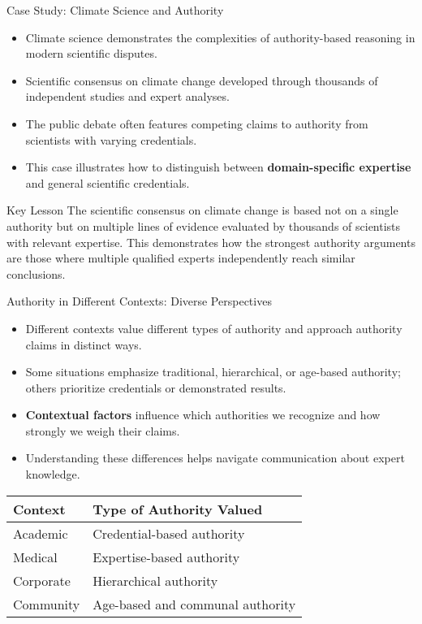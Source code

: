 \documentclass{beamer}
\begin{document}
\begin{frame}{Case Study: Climate Science and Authority}
    \begin{itemize}
        \item Climate science demonstrates the complexities of authority-based reasoning in modern scientific disputes.
        \item Scientific consensus on climate change developed through thousands of independent studies and expert analyses.
        \item The public debate often features competing claims to authority from scientists with varying credentials.
        \item This case illustrates how to distinguish between \textbf{domain-specific expertise} and general scientific credentials.
    \end{itemize}
    
    \begin{alertblock}{Key Lesson}
        The scientific consensus on climate change is based not on a single authority but on multiple lines of evidence evaluated by thousands of scientists with relevant expertise. This demonstrates how the strongest authority arguments are those where multiple qualified experts independently reach similar conclusions.
    \end{alertblock}
\end{frame}

\begin{frame}{Authority in Different Contexts: Diverse Perspectives}
    \begin{itemize}
        \item Different contexts value different types of authority and approach authority claims in distinct ways.
        \item Some situations emphasize traditional, hierarchical, or age-based authority; others prioritize credentials or demonstrated results.
        \item \textbf{Contextual factors} influence which authorities we recognize and how strongly we weigh their claims.
        \item Understanding these differences helps navigate communication about expert knowledge.
    \end{itemize}
    
    \begin{table}
        \centering
        \begin{tabular}{|l|l|}
            \hline
            \textbf{Context} & \textbf{Type of Authority Valued} \\
            \hline
            Academic & Credential-based authority \\
            Medical & Expertise-based authority \\
            Corporate & Hierarchical authority \\
            Community & Age-based and communal authority \\
            \hline
        \end{tabular}
    \end{table}
\end{frame}
\end{document}
